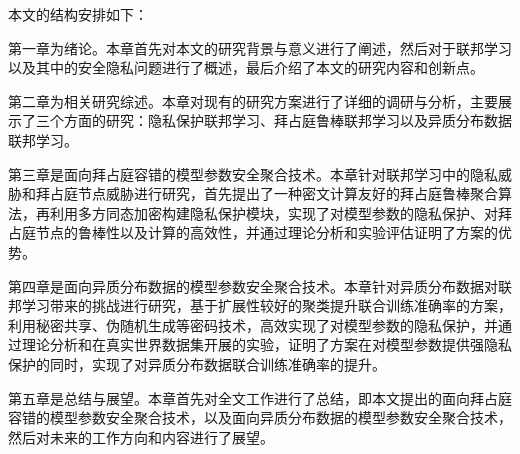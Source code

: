 本文的结构安排如下：

第一章为绪论。本章首先对本文的研究背景与意义进行了阐述，然后对于联邦学习以及其中的安全隐私问题进行了概述，最后介绍了本文的研究内容和创新点。

第二章为相关研究综述。本章对现有的研究方案进行了详细的调研与分析，主要展示了三个方面的研究：隐私保护联邦学习、拜占庭鲁棒联邦学习以及异质分布数据联邦学习。

第三章是面向拜占庭容错的模型参数安全聚合技术。本章针对联邦学习中的隐私威胁和拜占庭节点威胁进行研究，首先提出了一种密文计算友好的拜占庭鲁棒聚合算法，再利用多方同态加密构建隐私保护模块，实现了对模型参数的隐私保护、对拜占庭节点的鲁棒性以及计算的高效性，并通过理论分析和实验评估证明了方案的优势。

第四章是面向异质分布数据的模型参数安全聚合技术。本章针对异质分布数据对联邦学习带来的挑战进行研究，基于扩展性较好的聚类提升联合训练准确率的方案，利用秘密共享、伪随机生成等密码技术，高效实现了对模型参数的隐私保护，并通过理论分析和在真实世界数据集开展的实验，证明了方案在对模型参数提供强隐私保护的同时，实现了对异质分布数据联合训练准确率的提升。

第五章是总结与展望。本章首先对全文工作进行了总结，即本文提出的面向拜占庭容错的模型参数安全聚合技术，以及面向异质分布数据的模型参数安全聚合技术，然后对未来的工作方向和内容进行了展望。

